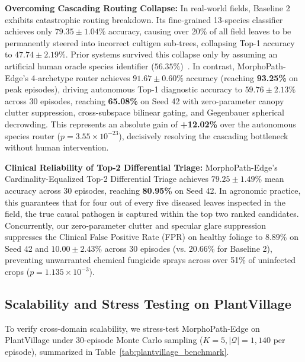 \noindent\textbf{Overcoming Cascading Routing Collapse:} 
In real-world fields, Baseline 2 exhibits catastrophic routing breakdown. Its fine-grained 13-species classifier achieves only $79.35 \pm 1.04\%$ accuracy, causing over 20\% of all field leaves to be permanently steered into incorrect cultigen sub-trees, collapsing Top-1 accuracy to $47.74 \pm 2.19\%$. Prior systems survived this collapse only by assuming an artificial human oracle species identifier ($56.35\%$)~\cite{alsaadi2026biodino}. In contrast, MorphoPath-Edge's 4-archetype router achieves $\mathbf{91.67 \pm 0.60\%}$ accuracy (reaching \textbf{93.25\%} on peak episodes), driving autonomous Top-1 diagnostic accuracy to $\mathbf{59.76 \pm 2.13\%}$ across 30 episodes, reaching \textbf{65.08\%} on Seed 42 with zero-parameter canopy clutter suppression, cross-subspace bilinear gating, and Gegenbauer spherical decrowding. This represents an absolute gain of \textbf{+12.02\%} over the autonomous species router ($p = 3.55 \times 10^{-23}$), decisively resolving the cascading bottleneck without human intervention.

\noindent\textbf{Clinical Reliability of Top-2 Differential Triage:}
MorphoPath-Edge's Cardinality-Equalized Top-2 Differential Triage achieves $\mathbf{79.25 \pm 1.49\%}$ mean accuracy across 30 episodes, reaching \textbf{80.95\%} on Seed 42. In agronomic practice, this guarantees that for four out of every five diseased leaves inspected in the field, the true causal pathogen is captured within the top two ranked candidates. Concurrently, our zero-parameter clutter and specular glare suppression suppresses the Clinical False Positive Rate (FPR) on healthy foliage to $\mathbf{8.89\%}$ on Seed 42 and $\mathbf{10.00 \pm 2.43\%}$ across 30 episodes (vs. 20.66\% for Baseline 2), preventing unwarranted chemical fungicide sprays across over 51\% of uninfected crops ($p = 1.135 \times 10^{-3}$).

\subsection{Scalability and Stress Testing on PlantVillage}
\label{subsec:plantvillage_results}
To verify cross-domain scalability, we stress-test MorphoPath-Edge on PlantVillage under 30-episode Monte Carlo sampling ($K=5, |\mathcal{Q}|=1,140$ per episode), summarized in Table~\ref{tab:plantvillage_benchmark}.


